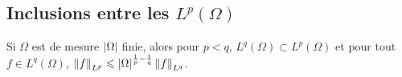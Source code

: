 



  
    
  
  
    
  


\subsection{Inclusions entre les $L^p(\Omega)$}

\begin{theo}{}
    Si $\Omega$ est de mesure $\left| \Omega \right|$ finie, alors pour $p<q$, $L^q(\Omega) \subset L^p(\Omega)$ et pour tout $f \in L^q(\Omega)$, $\norm{f}_{L^p} \leqslant \left| \Omega \right|^{\frac{1}{p} - \frac{1}{q}} \norm{f}_{L^q}$.
\end{theo}

